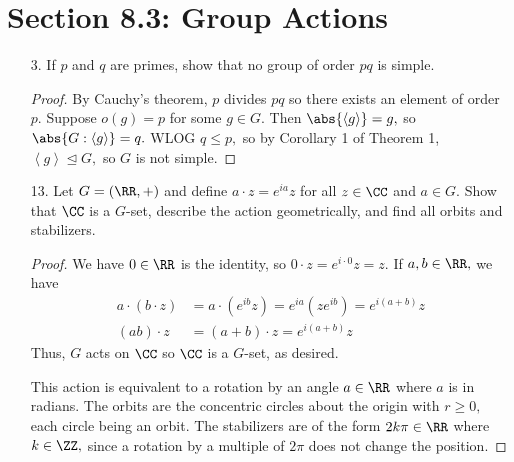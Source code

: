 \documentclass{article}
\begin{document}
\section*{Section 8.3: Group Actions}

\begin{itemize}
	\item[3.] If $p$ and $q$ are primes, show that no group of order $pq$ is simple.
		\begin{proof}
			By Cauchy's theorem, $p$ divides $pq$ so there exists an element of order $p.$ Suppose $o(g)=p$ for some $g\in G.$ Then $\abs{\left< g\right>}=g,$ so $\abs{G:\left< g\right>}=q.$ WLOG $q\le p,$ so by Corollary 1 of Theorem 1, $\left< g\right>\unlhd G,$ so $G$ is not simple.
			
		\end{proof}

	\item[13.] Let $G=\left( \RR, + \right)$ and define $a\cdot z=e^{ia}z$ for all $z\in\CC$ and $a\in G.$ Show that $\CC$ is a $G$-set, describe the action geometrically, and find all orbits and stabilizers.
		\begin{proof}
			We have $0\in \RR$ is the identity, so $0\cdot z = e^{i\cdot 0} z = z.$ If $a, b\in\RR,$ we have
			\begin{align*}
				a\cdot(b\cdot z) &= a\cdot (e^{ib}z) = e^{ia}(z e^{ib}) = e^{i(a+b)}z \\
				(ab)\cdot z &= (a+b)\cdot z = e^{i(a+b)}z
			\end{align*}
			Thus, $G$ acts on $\CC$ so $\CC$ is a $G$-set, as desired. 

			This action is equivalent to a rotation by an angle $a\in \RR$ where $a$ is in radians. The orbits are the concentric circles about the origin with $r\ge 0,$ each circle being an orbit. The stabilizers are of the form $2k\pi\in \RR$ where $k\in\ZZ,$ since a rotation by a multiple of $2\pi$ does not change the position.
			
		\end{proof}


\end{itemize}
\end{document}
